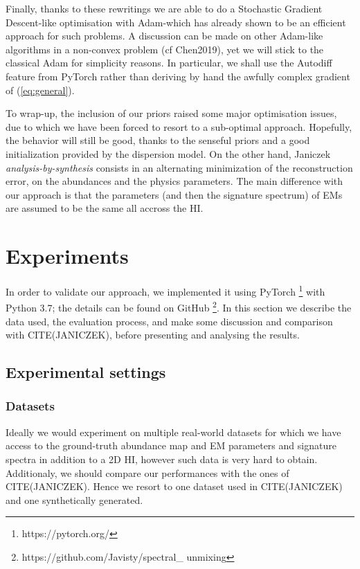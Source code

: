 \documentclass{article}
\begin{document}
Finally, thanks to these rewritings we are able to do a Stochastic Gradient Descent-like optimisation with Adam-which has already shown to be an efficient approach for such problems. A discussion can be made on other Adam-like algorithms in a non-convex problem (cf Chen2019), yet we will stick to the classical Adam for simplicity reasons. In particular, we shall use the Autodiff feature from PyTorch rather than deriving by hand the awfully complex gradient of (\ref{eq:general}).

To wrap-up, the inclusion of our priors raised some major optimisation issues, due to which we have been forced to resort to a sub-optimal approach. Hopefully, the behavior will still be good, thanks to the senseful priors and a good initialization provided by the dispersion model. On the other hand, Janiczek \emph{analysis-by-synthesis} consists in an alternating minimization of the reconstruction error, on the abundances and the physics parameters. The main difference with our approach is that the parameters (and then the signature spectrum) of EMs are assumed to be the same all accross the HI.

\section{Experiments}
In order to validate our approach, we implemented it using \textsf{PyTorch} \footnote{https://pytorch.org/} with \textsf{Python 3.7}; the details can be found on GitHub \footnote{https://github.com/Javisty/spectral\_
unmixing}. In this section we describe the data used, the evaluation process, and make some discussion and comparison with CITE(JANICZEK), before presenting and analysing the results.

\subsection{Experimental settings}
\subsubsection{Datasets}
Ideally we would experiment on multiple real-world datasets for which we have access to the ground-truth abundance map and EM parameters and signature spectra in addition to a 2D HI, however such data is very hard to obtain. Additionaly, we should compare our performances with the ones of CITE(JANICZEK). Hence we resort to one dataset used in CITE(JANICZEK) and one synthetically generated.
\end{document}
